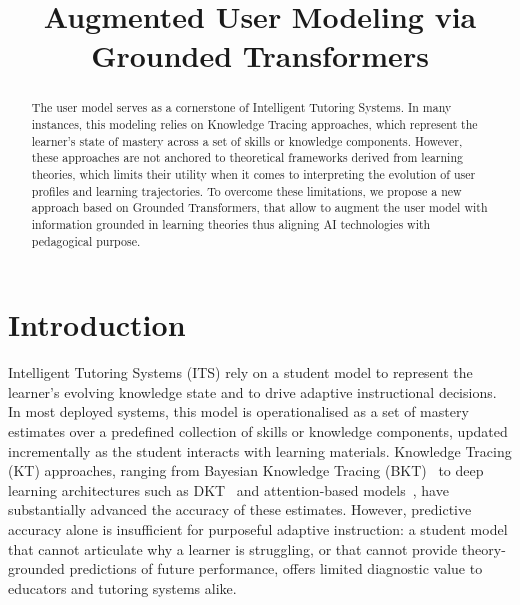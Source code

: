 \documentclass[runningheads]{llncs}
\begin{document}
%
\title{Augmented User Modeling via Grounded Transformers}
%
%
\authorrunning{}
%
\institute{}
%
\maketitle
%
\begin{abstract}

  
The user model serves as a cornerstone of Intelligent Tutoring Systems. In many instances, this modeling relies on Knowledge Tracing approaches, which represent the learner's state of mastery across a set of skills or knowledge components. However, these approaches are not anchored to theoretical frameworks derived from learning theories, which limits their utility when it comes to interpreting the evolution of user profiles and learning trajectories. To overcome these limitations, we propose a new approach based on Grounded Transformers, that allow to augment the user model with information grounded in learning theories thus aligning AI technologies with pedagogical purpose. 

\end{abstract}
%
%
\section{Introduction}

Intelligent Tutoring Systems (ITS) rely on a student model to represent the learner's evolving knowledge state and to drive adaptive instructional decisions. In most deployed systems, this model is operationalised as a set of mastery estimates over a predefined collection of skills or knowledge components, updated incrementally as the student interacts with learning materials. Knowledge Tracing (KT) approaches, ranging from Bayesian Knowledge Tracing (BKT)~\cite{corbett1994knowledge} to deep learning architectures such as DKT~\cite{piech2015deep} and attention-based models~\cite{ghosh2020context}, have substantially advanced the accuracy of these estimates. However, predictive accuracy alone is insufficient for purposeful adaptive instruction: a student model that cannot articulate why a learner is struggling, or that cannot provide theory-grounded predictions of future performance, offers limited diagnostic value to educators and tutoring systems alike.
\end{document}
